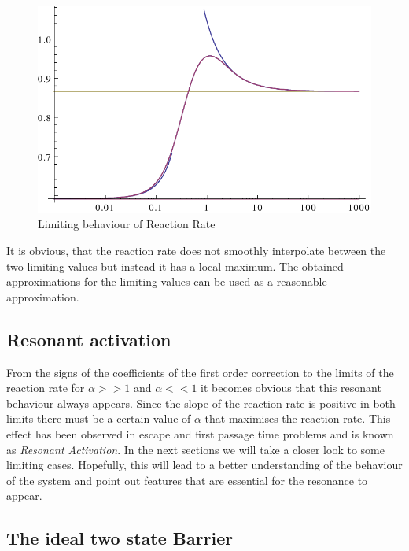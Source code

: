 \begin{figure}[H]
    \centering
    \includegraphics[width = 1 \textwidth]{plots/bothlimits.pdf}
    \caption{Limiting behaviour of Reaction Rate}
    \label{fig:rrlimit}
\end{figure}
It is obvious, that the reaction rate does not smoothly interpolate between the two limiting values but instead it has a local maximum. The obtained approximations for the limiting values can be used as a reasonable approximation.
\subsection{Resonant activation}
From the signs of the coefficients of the first order correction to the limits of the reaction rate for $\alpha>>1$ and $\alpha<<1$ it becomes obvious that this resonant behaviour always appears. Since the slope of the reaction rate is positive in both limits there must be a certain value of $\alpha$ that maximises the reaction rate. This effect has been observed in escape and first passage time problems and is known as \textit{Resonant Activation}.
In the next sections we will take a closer look to some limiting cases. Hopefully, this will lead to a better understanding of the behaviour of the system and point out features that are essential for the resonance to appear.

\subsection{The ideal two state Barrier}

